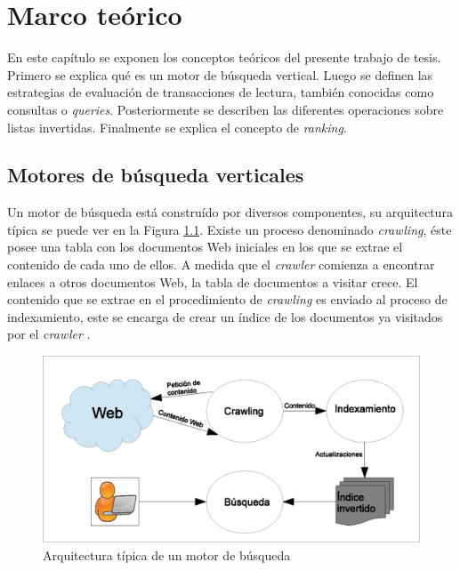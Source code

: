 \chapter{Marco te\'orico}
\label{cap:marco}
En este capítulo se exponen los conceptos teóricos del presente trabajo de tesis. Primero se explica qué es un motor de búsqueda vertical. Luego se definen las estrategias de evaluación de transacciones de lectura, también conocidas como consultas o \textit{queries}. Posteriormente se describen las diferentes operaciones sobre listas invertidas. Finalmente se explica el concepto de \textit{ranking}. 

\section{Motores de búsqueda verticales}
\label{marco:mbv}
Un motor de búsqueda está construído por diversos componentes, su arquitectura típica se puede ver en la Figura \ref{fig:searchenginearchitecture}. Existe un proceso denominado \textit{crawling}, éste posee una tabla con los documentos Web iniciales en los que se extrae el contenido de cada uno de ellos. A medida que el \textit{crawler} comienza a encontrar enlaces a otros documentos Web, la tabla de documentos a visitar crece. El contenido que se extrae en el procedimiento de \textit{crawling} es enviado al proceso de indexamiento, este se encarga de crear un índice de los documentos ya visitados por el \textit{crawler} \citep{Croft:2009}.

\begin{figure}[!th]
\centering
\includegraphics[scale=.75]{images/searchenginearchitecture.eps}
\caption{Arquitectura típica de un motor de búsqueda}
\label{fig:searchenginearchitecture}
\end{figure}

